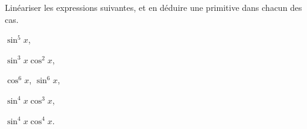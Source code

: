 
\begin{exercice}  \;
Lin\'eariser les expressions suivantes, et en d\'eduire une primitive dans chacun des cas.
\begin{enumerate}
\begin{minipage}[t]{0.45\textwidth}
\item $\sin^5{x}$,
\item $\sin^3{x}\cos^2{x}$,
\item $\cos^6{x}$, $\sin^6{x}$,
\end{minipage}
\begin{minipage}[t]{0.45\textwidth}
\item $\sin^4{x}\cos^3{x}$,
\item $\sin^4{x}\cos^4{x}$.
\end{minipage}
\end{enumerate}
\end{exercice}